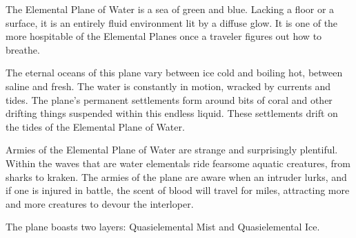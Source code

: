 The Elemental Plane of Water is a sea of green and blue. Lacking a floor or a surface, it is an entirely fluid environment lit by a diffuse glow. It is one of the more hospitable of the Elemental Planes once a traveler figures out how to breathe.

The eternal oceans of this plane vary between ice cold and boiling hot, between saline and fresh. The water is constantly in motion, wracked by currents and tides. The plane's permanent settlements form around bits of coral and other drifting things suspended within this endless liquid. These settlements drift on the tides of the Elemental Plane of Water.

Armies of the Elemental Plane of Water are strange and surprisingly plentiful. Within the waves that are water elementals ride fearsome aquatic creatures, from sharks to kraken. The armies of the plane are aware when an intruder lurks, and if one is injured in battle, the scent of blood will travel for miles, attracting more and more creatures to devour the interloper.

The plane boasts two layers: Quasielemental Mist and Quasielemental Ice.

\begin{figure}[h!]
\centering
{}
\end{figure}

